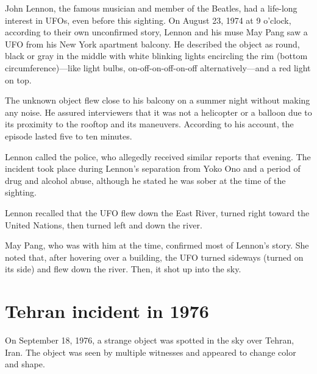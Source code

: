 \label{2023-UFO-chapter-History--1953-2016-jl1974}

John Lennon, the famous musician and member of the Beatles, had a life-long interest in UFOs, even before this sighting.
On August 23, 1974 at 9 o'clock, according to their own unconfirmed story,
Lennon and his muse May Pang saw a UFO from his New York apartment balcony.
He described the object as round, black or gray in the middle with white blinking lights encircling the rim
(bottom circumference)---like light bulbs, on-off-on-off-on-off alternatively---and a red light on top.

The unknown object flew close to his balcony on a summer night without making any noise.
He assured interviewers that it was not a helicopter or a balloon due to its proximity to the rooftop and its maneuvers.
According to his account, the episode lasted five to ten minutes.

Lennon called the police, who allegedly received similar reports that evening.
The incident took place during Lennon's separation from Yoko Ono and a period of drug and alcohol abuse,
although he stated he was sober at the time of the sighting.

Lennon recalled that the UFO flew down the East River, turned right toward the United Nations, then turned left and down the river.




May Pang, who was with him at the time, confirmed most of Lennon's story.
She noted that, after hovering over a building, the UFO turned sideways (turned on its side) and flew down the river.
Then, it shot up into the sky.

\section{Tehran incident in 1976}

\label{2023-UFO-chapter-History--1953-2016-tui1976}

On September 18, 1976, a strange object was spotted in the sky over Tehran, Iran.
The object was seen by multiple witnesses and appeared to change color and shape.

